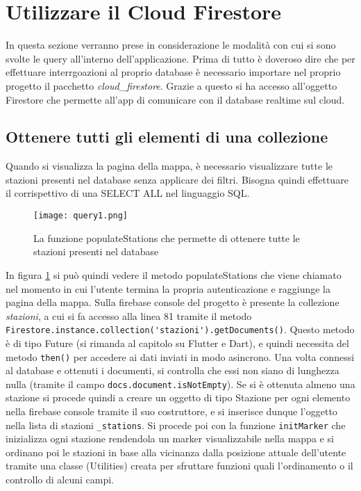 \section{Utilizzare il Cloud Firestore}
In questa sezione verranno prese in considerazione le modalità con cui si sono
svolte le query all'interno dell'applicazione. Prima di tutto è doveroso dire
che per effettuare interrgoazioni al proprio database è necessario importare nel
proprio progetto il pacchetto \textit{cloud\_firestore}. Grazie a questo si ha
accesso all'oggetto Firestore che permette all'app di comunicare con il database
realtime sul cloud.
\subsection{Ottenere tutti gli elementi di una collezione}
Quando si visualizza la pagina della mappa, è necessario visualizzare tutte le
stazioni presenti nel database senza applicare dei filtri. Bisogna quindi
effettuare il corrispettivo di una SELECT ALL nel linguaggio SQL. 
\begin{figure}[!h]
    \centering
    \texttt{[image: query1.png]}
    \caption{La funzione populateStations che permette di ottenere tutte le stazioni presenti nel database}
    \label{query1}
\end{figure}
In figura \ref{query1} si può quindi vedere il metodo populateStations che viene
chiamato nel momento in cui l'utente termina la propria autenticazione e
raggiunge la pagina della mappa. Sulla firebase console del progetto è presente
la collezione \textit{stazioni}, a cui si fa accesso alla linea 81 tramite il
metodo \verb|Firestore.instance.collection('stazioni').getDocuments()|. Questo
metodo è di tipo Future (si rimanda al capitolo su Flutter e Dart), e quindi
necessita del metodo \verb|then()| per accedere ai dati inviati in modo
asincrono. Una volta connessi al database e ottenuti i documenti, si controlla
che essi non siano di lunghezza nulla (tramite il campo
\verb|docs.document.isNotEmpty|). Se si è ottenuta almeno una stazione si
procede quindi a creare un oggetto di tipo Stazione per ogni elemento nella
firebase console tramite il suo costruttore, e si inserisce dunque l'oggetto
nella lista di stazioni \verb|_stations|. Si procede poi con la funzione
\verb|initMarker| che inizializza ogni stazione rendendola un marker
visualizzabile nella mappa e si ordinano poi le stazioni in base alla vicinanza
dalla posizione attuale dell'utente tramite una classe (Utilities) creata per
sfruttare funzioni quali l'ordinamento o il controllo di alcuni campi.


